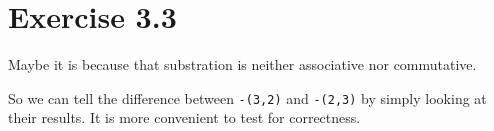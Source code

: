 \section{Exercise 3.3}

Maybe it is because that substration is neither associative nor commutative.

So we can tell the difference between \texttt{-(3,2)} and \texttt{-(2,3)} by simply
looking at their results. It is more convenient to test for correctness.
